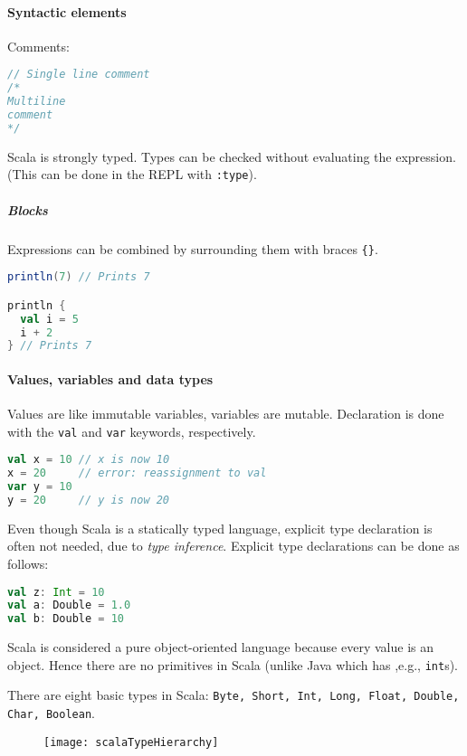 \paragraph{Syntactic elements}

Comments:
\begin{lstlisting}[language=scala, style=snippet]
// Single line comment
/*
Multiline
comment
*/
\end{lstlisting}

Scala is strongly typed. Types can be checked without evaluating the expression. (This can be done in the REPL with \texttt{:type}).

\subparagraph{Blocks}
Expressions can be combined by surrounding them with braces \texttt{\{\}}.
\begin{lstlisting}[language=scala, style=snippet]
println(7) // Prints 7

println {
  val i = 5
  i + 2
} // Prints 7
\end{lstlisting}

\paragraph{Values, variables and data types}
Values are like immutable variables, variables are mutable. Declaration is done with the \texttt{val} and \texttt{var} keywords, respectively.
\begin{lstlisting}[language=scala, style=snippet]
val x = 10 // x is now 10
x = 20     // error: reassignment to val
var y = 10
y = 20     // y is now 20
\end{lstlisting}
Even though Scala is a statically typed language, explicit type declaration is often not needed, due to \textit{type inference}. Explicit type declarations can be done as follows:
\begin{lstlisting}[language=scala, style=snippet]
val z: Int = 10
val a: Double = 1.0
val b: Double = 10
\end{lstlisting}

Scala is considered a pure object-oriented language because every value is an object. Hence there are no primitives in Scala (unlike Java which has ,e.g., \texttt{int}s).

There are eight basic types in Scala: \texttt{Byte, Short, Int, Long, Float, Double, Char, Boolean}.

\begin{figure}[h]
\label{scalaTypeHierarchy}
\texttt{[image: scalaTypeHierarchy]}
\centering
\end{figure}

